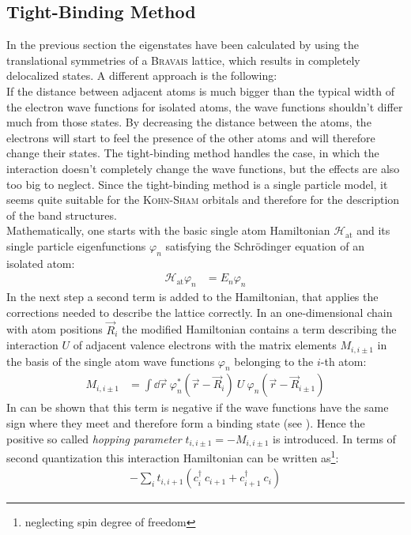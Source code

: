 \subsection{Tight-Binding Method}
In the previous section the eigenstates have been calculated by using the translational symmetries of a \textsc{Bravais} lattice, which results in completely delocalized states. A different approach is the following:\\
If the distance between adjacent atoms is much bigger than the typical width of the electron wave functions for isolated atoms, the wave functions shouldn't differ much from those states. By decreasing the distance between the atoms, the electrons will start to feel the presence of the other atoms and will therefore change their states. The tight-binding method handles the case, in which the interaction doesn't completely change the wave functions, but the effects are also too big to neglect. Since the tight-binding method is a single particle model, it seems quite suitable for the \textsc{Kohn-Sham} orbitals and therefore for the description of the band structures.\\
Mathematically, one starts with the basic single atom Hamiltonian $\mathcal{H}_{\text{at}}$ and its single particle eigenfunctions $\varphi_n$ satisfying the Schrödinger equation of an isolated atom:
\begin{align}
	\mathcal{H}_{\text{at}} \varphi_n &= E_n \varphi_n
\end{align}
In the next step a second term is added to the Hamiltonian, that applies the corrections needed to describe the lattice correctly. In an one-dimensional chain with atom positions $\vec{R}_i$ the modified Hamiltonian contains a term describing the interaction $U$ of adjacent valence electrons with the matrix elements $M_{i, i\pm1}$ in the basis of the single atom wave functions $\varphi_n$ belonging to the $i$-th atom:
\begin{align}
	M_{i, i\pm1} &= \int\dd\vec{r}\ \varphi_n^*\left(\vec{r} - \vec{R}_i\right)\ U\ \varphi_n\left(\vec{r}-\vec{R}_{i\pm1}\right) 
\end{align}
In can be shown that this term is negative if the wave functions have the same sign where they meet and therefore form a binding state (see \cite{rohrer}). Hence the positive so called \emph{hopping parameter} $t_{i, i\pm 1} = - M_{i, i\pm 1}$ is introduced. In terms of second quantization this interaction Hamiltonian can be written as\footnote{neglecting spin degree of freedom}:
\begin{align}
	- \sum_i t_{i, i+1} \left(c_i^\dagger\  c_{i+1} + c_{i+1}^\dagger\  c_i\right)
\end{align}

